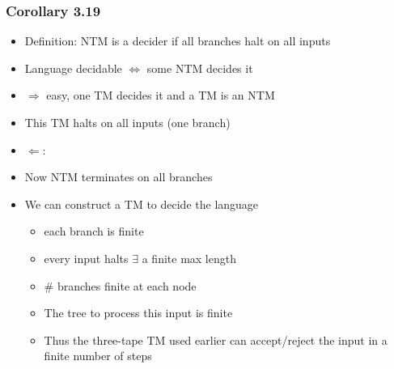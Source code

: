 
\begin{frame}[allowframebreaks] \frametitle{Corollary 3.19}
  \begin{itemize}
\item Definition: NTM is a decider if all branches halt on all inputs


\item Language decidable $\Leftrightarrow$
some NTM decides it

\item
  $\Rightarrow$ easy, one TM decides it and a TM is an NTM

\item
  [] This TM halts on all inputs (one branch)

\item
  $\Leftarrow$:
\item
  [] Now NTM terminates on all branches 

\item
  [] We can construct a TM to decide the language
\begin{itemize}
\item each branch is finite

\item [] every input halts $\exists $ a finite max length
\item \# branches finite at each node

\item
  [] The tree to process this input is finite
\item Thus the three-tape TM used earlier can accept/reject the input
  in a finite number of steps
\end{itemize}

\end{itemize}\end{frame}







